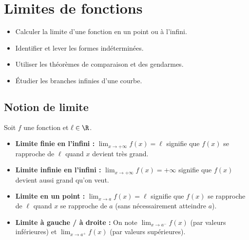 
\chapter{Limites de fonctions}

\begin{objectifs}
	\begin{itemize}
		\item Calculer la limite d'une fonction en un point ou à l'infini.
		\item Identifier et lever les formes indéterminées.
		\item Utiliser les théorèmes de comparaison et des gendarmes.
		\item Étudier les branches infinies d'une courbe.
	\end{itemize}
\end{objectifs}

\section{Notion de limite}

\begin{definition}
	Soit $f$ une fonction et $\ell \in \R$.
	
	\begin{itemize}
		\item \textbf{Limite finie en l'infini :}
		$\displaystyle\lim_{x\to+\infty}f(x)=\ell$ signifie que $f(x)$
		se rapproche de $\ell$ quand $x$ devient très grand.
		
		\item \textbf{Limite infinie en l'infini :}
		$\displaystyle\lim_{x\to+\infty}f(x)=+\infty$ signifie que $f(x)$
		devient aussi grand qu'on veut.
		
		\item \textbf{Limite en un point :}
		$\displaystyle\lim_{x\to a}f(x)=\ell$ signifie que $f(x)$
		se rapproche de $\ell$ quand $x$ se rapproche de $a$
		(sans nécessairement atteindre $a$).
		
		\item \textbf{Limite à gauche / à droite :}
		On note $\displaystyle\lim_{x\to a^-}f(x)$ (par valeurs inférieures)
		et $\displaystyle\lim_{x\to a^+}f(x)$ (par valeurs supérieures).
	\end{itemize}
\end{definition}

